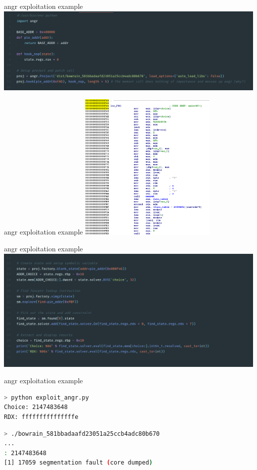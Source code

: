 \documentclass[10pt, compress, aspectratio=169]{beamer}
\begin{document}
\begin{frame}{angr exploitation example}
  \includegraphics[width=\textwidth]{images/exploit-1-angr-a.png}
\end{frame}

\begin{frame}{angr exploitation example}
  \includegraphics[width=0.5\textwidth]{images/exploit-2-ida2.png}
\end{frame}

\begin{frame}{angr exploitation example}
  \includegraphics[width=\textwidth]{images/exploit-1-angr-b.png}
\end{frame}

\begin{frame}[fragile]{angr exploitation example}

\begin{lstlisting}[language=bash]
> python exploit_angr.py
Choice: 2147483648
RDX: fffffffffffffffe
\end{lstlisting}

\begin{lstlisting}[language=bash]
> ./bowrain_581bbadaafd23051a25ccb4adc80b670
...
: 2147483648
[1] 17059 segmentation fault (core dumped)
\end{lstlisting}

\end{frame}
\end{document}
